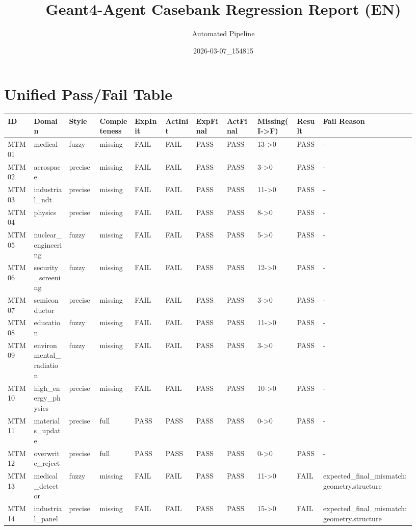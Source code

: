 \documentclass[11pt]{ctexart}
\title{Geant4-Agent Casebank Regression Report (EN)}
\author{Automated Pipeline}
\date{2026-03-07\_154815}
\begin{document}
\maketitle
\section{Unified Pass/Fail Table}
\begin{longtable}{p{0.06\linewidth}p{0.08\linewidth}p{0.07\linewidth}p{0.08\linewidth}p{0.07\linewidth}p{0.07\linewidth}p{0.07\linewidth}p{0.07\linewidth}p{0.09\linewidth}p{0.06\linewidth}p{0.21\linewidth}}
\toprule
ID & Domain & Style & Completeness & ExpInit & ActInit & ExpFinal & ActFinal & Missing(I->F) & Result & Fail Reason \\
\midrule
MTM01 & medical & fuzzy & missing & FAIL & FAIL & PASS & PASS & 13->0 & PASS & - \\
MTM02 & aerospace & precise & missing & FAIL & FAIL & PASS & PASS & 3->0 & PASS & - \\
MTM03 & industrial\_ndt & precise & missing & FAIL & FAIL & PASS & PASS & 11->0 & PASS & - \\
MTM04 & physics & precise & missing & FAIL & FAIL & PASS & PASS & 8->0 & PASS & - \\
MTM05 & nuclear\_engineering & fuzzy & missing & FAIL & FAIL & PASS & PASS & 5->0 & PASS & - \\
MTM06 & security\_screening & fuzzy & missing & FAIL & FAIL & PASS & PASS & 12->0 & PASS & - \\
MTM07 & semiconductor & precise & missing & FAIL & FAIL & PASS & PASS & 3->0 & PASS & - \\
MTM08 & education & fuzzy & missing & FAIL & FAIL & PASS & PASS & 11->0 & PASS & - \\
MTM09 & environmental\_radiation & fuzzy & missing & FAIL & FAIL & PASS & PASS & 3->0 & PASS & - \\
MTM10 & high\_energy\_physics & precise & missing & FAIL & FAIL & PASS & PASS & 10->0 & PASS & - \\
MTM11 & materials\_update & precise & full & PASS & PASS & PASS & PASS & 0->0 & PASS & - \\
MTM12 & overwrite\_reject & precise & full & PASS & PASS & PASS & PASS & 0->0 & PASS & - \\
MTM13 & medical\_detector & fuzzy & missing & FAIL & FAIL & PASS & PASS & 11->0 & FAIL & expected\_final\_mismatch:geometry.structure \\
MTM14 & industrial\_panel & precise & missing & FAIL & FAIL & PASS & PASS & 15->0 & FAIL & expected\_final\_mismatch:geometry.structure \\

\end{longtable}
\end{document}
